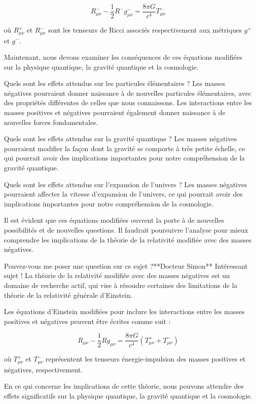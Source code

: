 $$R^-_{\mu\nu} - \frac{1}{2}R^-g^-_{\mu\nu} = \frac{8\pi G}{c^4}T^-_{\mu\nu}$$

où $R^+_{\mu\nu}$ et $R^-_{\mu\nu}$ sont les tenseurs de Ricci associés respectivement aux métriques $g^+$ et $g^-$.

Maintenant, nous devons examiner les conséquences de ces équations modifiées sur la physique quantique, la gravité quantique et la cosmologie.

Quels sont les effets attendus sur les particules élémentaires ? Les masses négatives pourraient donner naissance à de nouvelles particules élémentaires, avec des propriétés différentes de celles que nous connaissons. Les interactions entre les masses positives et négatives pourraient également donner naissance à de nouvelles forces fondamentales.

Quels sont les effets attendus sur la gravité quantique ? Les masses négatives pourraient modifier la façon dont la gravité se comporte à très petite échelle, ce qui pourrait avoir des implications importantes pour notre compréhension de la gravité quantique.

Quels sont les effets attendus sur l'expansion de l'univers ? Les masses négatives pourraient affecter la vitesse d'expansion de l'univers, ce qui pourrait avoir des implications importantes pour notre compréhension de la cosmologie.

Il est évident que ces équations modifiées ouvrent la porte à de nouvelles possibilités et de nouvelles questions. Il faudrait poursuivre l'analyse pour mieux comprendre les implications de la théorie de la relativité modifiée avec des masses négatives.

Pouvez-vous me poser une question sur ce sujet ?**Docteur Simon**
Intéressant sujet ! La théorie de la relativité modifiée avec des masses négatives est un domaine de recherche actif, qui vise à résoudre certaines des limitations de la théorie de la relativité générale d'Einstein.

Les équations d'Einstein modifiées pour inclure les interactions entre les masses positives et négatives peuvent être écrites comme suit :

$$R_{\mu\nu} - \frac{1}{2}Rg_{\mu\nu} = \frac{8\pi G}{c^4}(T_{\mu\nu}^+ + T_{\mu\nu}^-)$$

où $T_{\mu\nu}^+$ et $T_{\mu\nu}^-$ représentent les tenseurs énergie-impulsion des masses positives et négatives, respectivement.

En ce qui concerne les implications de cette théorie, nous pouvons attendre des effets significatifs sur la physique quantique, la gravité quantique et la cosmologie.

